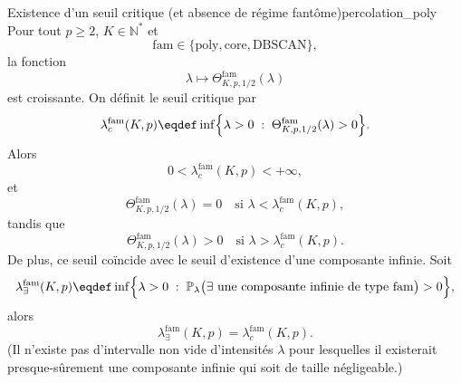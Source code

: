 \begin{Fait}{Existence d'un seuil critique (et absence de régime fantôme)}{percolation_poly}
Pour tout $p\geq 2$, $K\in\mathbb{N}^{\ast}$ et
\[
\mathrm{fam}\in\{\mathrm{poly},\mathrm{core},\mathrm{DBSCAN}\},
\]
la fonction
\[
\lambda\longmapsto
\Theta^{\mathrm{fam}}_{K,p,1/2}(\lambda)
\]
est croissante. On définit le seuil critique par
\[
\lambda^{\mathrm{fam}}_{c}(K,p)
\eqdef
\inf\Bigl\{
\lambda>0 \;:\;
\Theta^{\mathrm{fam}}_{K,p,1/2}(\lambda)>0
\Bigr\}.
\]
Alors
\[
0<\lambda^{\mathrm{fam}}_{c}(K,p)<+\infty,
\]
et
\[
\Theta^{\mathrm{fam}}_{K,p,1/2}(\lambda)=0
\quad\text{si }\lambda<\lambda^{\mathrm{fam}}_{c}(K,p),
\]
tandis que
\[
\Theta^{\mathrm{fam}}_{K,p,1/2}(\lambda)>0
\quad\text{si }\lambda>\lambda^{\mathrm{fam}}_{c}(K,p).
\]
De plus, ce seuil coïncide avec le seuil d'existence d'une composante
infinie. Soit
\[
\lambda^{\mathrm{fam}}_{\exists}(K,p)
\eqdef
\inf\Bigl\{
\lambda>0 \;:\;
\mathbb{P}_{\lambda}\bigl(
\exists\text{ une composante infinie de type }\mathrm{fam}
\bigr)>0
\Bigr\},
\]
alors
\[
    \lambda^{\mathrm{fam}}_{\exists}(K,p) = \lambda^{\mathrm{fam}}_{c}(K,p).
\]
(Il n'existe pas d'intervalle non vide d'intensités $\lambda$ pour lesquelles il existerait presque-sûrement une composante infinie qui soit de taille négligeable.)
\end{Fait}

